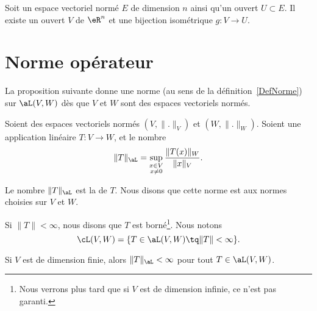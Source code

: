 \begin{proposition}	\label{PROPooILSOooPdUyFu}
	Soit un espace vectoriel normé \( E\) de dimension \( n\) ainsi qu'un ouvert \( U\subset  E\). Il existe un ouvert \( V\) de \( \eR^n\) et une bijection isométrique \(g \colon V\to U  \).
\end{proposition}

\section{Norme opérateur}

La proposition suivante donne une norme (au sens de la définition~\ref{DefNorme}) sur \( \aL(V,W)\) dès que \( V\) et \( W\) sont des espaces vectoriels normés.
\begin{definition}          \label{DefNFYUooBZCPTr}
	Soient des espaces vectoriels normés \( (V,\| . \|_V)\) et \( (W,\| . \|_W)\). Soient une application linéaire \( T\colon V\to W\), et le nombre
	\begin{equation}
		\|T\|_{\aL}=\sup_{\substack{x\in V\\x\neq 0}}\frac{\|T(x)\|_{W}}{\|x\|_{V}}.
	\end{equation}

	Le nombre \( \| T \|_{\aL}\) est la  de \( T\). Nous disons que cette norme est  aux normes choisies sur \( V\) et \( W\).

	Si \( \| T \|<\infty\), nous disons que \( T\) est borné\footnote{Nous verrons plus tard que si \( V\) est de dimension infinie, ce n'est pas garanti.}. Nous notons
	\begin{equation}
		\cL(V,W)=\{ T\in\aL(V,W)\tq \| T \|<\infty \}.
	\end{equation}
\end{definition}

\begin{proposition}	\label{PROPooQMZLooOxBrmt}
	Si \( V\) est de dimension finie, alors \( \| T \|_{\aL}<\infty\) pour tout \( T\in\aL(V,W)\).
\end{proposition}

